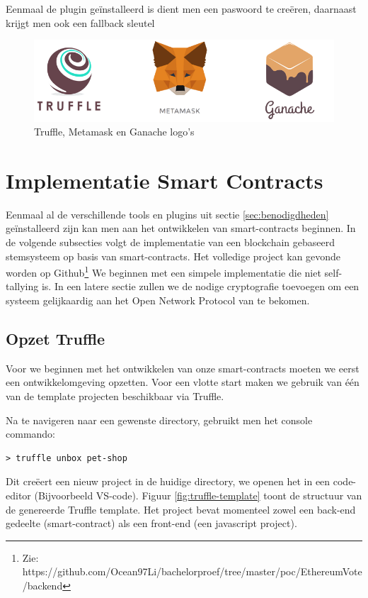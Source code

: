 	Eenmaal de plugin geïnstalleerd is dient men een paswoord te creëren, daarnaast krijgt men ook een fallback sleutel
	
	\begin{figure}
		\includegraphics[width=\linewidth]{img/metamask-truffle-ganache.png}
		\caption{Truffle, Metamask en Ganache logo's}
		\label{fig:metamask-truffle-ganache}
	\end{figure}
	\newpage
\section{Implementatie Smart Contracts}
	Eenmaal al de verschillende tools en plugins uit sectie \ref{sec:benodigdheden} geïnstalleerd zijn kan men aan het ontwikkelen van smart-contracts beginnen. In de volgende subsecties volgt de implementatie van een blockchain gebaseerd stemsysteem op basis van smart-contracts. Het volledige project kan gevonde worden op Github\footnote{Zie: https://github.com/Ocean97Li/bachelorproef/tree/master/poc/EthereumVote/backend} We beginnen met een simpele implementatie die niet self-tallying is. In een latere sectie zullen we de nodige cryptografie toevoegen om een systeem gelijkaardig aan het Open Network Protocol van  \textcite{McCorry2017} te bekomen.
	\subsection{Opzet Truffle}
	Voor we beginnen met het ontwikkelen van onze smart-contracts moeten we eerst een ontwikkelomgeving opzetten. Voor een vlotte start maken we gebruik van één van de template projecten beschikbaar via Truffle. 
	
	Na te navigeren naar een gewenste directory, gebruikt men het console commando: 
	 \lstset{language=bash}
	\begin{lstlisting}[numbers=none]
	> truffle unbox pet-shop
	\end{lstlisting}
	
	Dit creëert een nieuw project in de huidige directory, we openen het in een code-editor (Bijvoorbeeld VS-code). Figuur \ref{fig:truffle-template} toont de structuur van de genereerde Truffle template. Het project bevat momenteel zowel een back-end gedeelte (smart-contract) als een front-end (een javascript project). 
	
